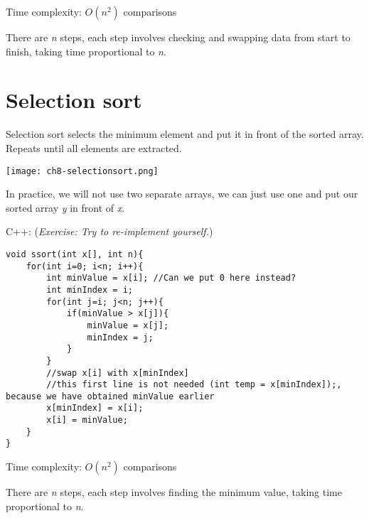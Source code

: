 Time complexity: $O(n^2)$ comparisons
\vspace{6mm}

There are \textit{n} steps, each step involves checking and swapping data from start to finish, taking time proportional to \textit{n}.

\pagebreak

\section{Selection sort}

Selection sort selects the minimum element and put it in front of the sorted array. Repeats until all elements are extracted.

\texttt{[image: ch8-selectionsort.png]}

\pagebreak


\pagebreak

In practice, we will not use two separate arrays, we can just use one and put our sorted array \textit{y} in front of \textit{x}.
\vspace{6mm}

C++: (\textit{Exercise: Try to re-implement yourself.})
\begin{lstlisting}
void ssort(int x[], int n){
    for(int i=0; i<n; i++){
        int minValue = x[i]; //Can we put 0 here instead?
        int minIndex = i;
        for(int j=i; j<n; j++){
            if(minValue > x[j]){
                minValue = x[j];
                minIndex = j;
            }
        }
        //swap x[i] with x[minIndex]
        //this first line is not needed (int temp = x[minIndex]);, because we have obtained minValue earlier
        x[minIndex] = x[i];
        x[i] = minValue;        
    }
}
\end{lstlisting}

Time complexity: $O(n^2)$ comparisons
\vspace{6mm}

There are \textit{n} steps, each step involves finding the minimum value, taking time proportional to \textit{n}.

